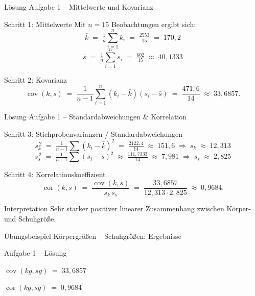 \documentclass[aspectratio=169,11pt]{beamer}
\begin{document}
\begin{frame}{Lösung Aufgabe 1 -- Mittelwerte und Kovarianz}
  \begin{block}{Schritt 1: Mittelwerte}
    Mit $n = 15$ Beobachtungen ergibt sich:
    \[
      \bar{k} \;=\; \tfrac{1}{n}\!\sum_{i=1}^{n} k_i
              \;=\; \tfrac{2553}{15} \;=\; 170{,}2
    \]
    \[
      \bar{s} \;=\; \tfrac{1}{n}\!\sum_{i=1}^{n} s_i
              \;=\; \tfrac{602}{15} \;\approx\; 40{,}1333
    \]
  \end{block}

  \begin{block}{Schritt 2: Kovarianz}
    \[
      \operatorname{cov}(k,s)
        \;=\; \frac{1}{n-1}\sum_{i=1}^{n}(k_i - \bar{k})(s_i - \bar{s})
        \;=\; \frac{471{,}6}{14}
        \;\approx\; 33{,}6857.
    \]
  \end{block}
\end{frame}

\begin{frame}{Lösung Aufgabe 1 -- Standardabweichungen \& Korrelation}
  \begin{block}{Schritt 3: Stichprobenvarianzen / Standardabweichungen}
    \[
      s_k^{\,2}
        \;=\; \tfrac{1}{n-1}\!\sum (k_i - \bar{k})^{2}
        \;=\; \tfrac{2122{,}4}{14}
        \;\approx\; 151{,}6
        \;\Rightarrow\; s_k \;\approx\; 12{,}313
    \]
    \[
      s_s^{\,2}
        \;=\; \tfrac{1}{n-1}\!\sum (s_i - \bar{s})^{2}
        \;\approx\; \tfrac{111{,}7333}{14}
        \;\approx\; 7{,}981
        \;\Rightarrow\; s_s \;\approx\; 2{,}825
    \]
  \end{block}

  \begin{exampleblock}{Schritt 4: Korrelationskoeffizient}
    \[
      \operatorname{cor}(k,s)
        \;=\; \frac{\operatorname{cov}(k,s)}{s_k\,s_s}
        \;=\; \frac{33{,}6857}{12{,}313 \cdot 2{,}825}
        \;\approx\; 0{,}9684.
    \]
  \end{exampleblock}

  \begin{alertblock}{Interpretation}
    Sehr starker positiver linearer Zusammenhang zwischen
    Körper- und Schuhgröße.
  \end{alertblock}
\end{frame}

\begin{frame}{Übungsbeispiel Körpergrößen -- Schuhgrößen: Ergebnisse}
  \begin{block}{Aufgabe 1 -- Lösung}
    \begin{description}
      \setlength{\itemsep}{0.4em}
      \item[die Kovarianz]
            $\operatorname{cov}(\mathit{kg}, \mathit{sg}) \;=\; 33{,}6857$
      \item[der Korrelationskoeffizient]
            $\operatorname{cor}(\mathit{kg}, \mathit{sg}) \;=\; 0{,}9684$
    \end{description}
  \end{block}
\end{frame}
\end{document}
